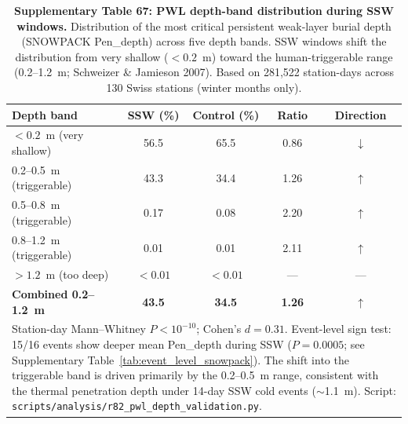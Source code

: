 \documentclass[11pt,letterpaper]{article}
\begin{document}

\begin{table}[!ht]
\centering
\caption{\textbf{Supplementary Table 67: PWL depth-band distribution during SSW windows.}
Distribution of the most critical persistent weak-layer burial depth (SNOWPACK Pen\_depth) across five depth bands. SSW windows shift the distribution from very shallow ($< 0.2$~m) toward the human-triggerable range (0.2--1.2~m; Schweizer \& Jamieson 2007). Based on 281,522 station-days across 130 Swiss stations (winter months only).}
\label{tab:pwl_depth_bands}
\small
\begin{tabular}{lcccc}
\toprule
Depth band & SSW (\%) & Control (\%) & Ratio & Direction \\
\midrule
$< 0.2$~m (very shallow) & 56.5 & 65.5 & 0.86 & $\downarrow$ \\
0.2--0.5~m (triggerable) & 43.3 & 34.4 & 1.26 & $\uparrow$ \\
0.5--0.8~m (triggerable) & 0.17 & 0.08 & 2.20 & $\uparrow$ \\
0.8--1.2~m (triggerable) & 0.01 & 0.01 & 2.11 & $\uparrow$ \\
$> 1.2$~m (too deep) & $< 0.01$ & $< 0.01$ & --- & --- \\
\midrule
\textbf{Combined 0.2--1.2~m} & \textbf{43.5} & \textbf{34.5} & \textbf{1.26} & $\uparrow$ \\
\bottomrule
\multicolumn{5}{p{12cm}}{\footnotesize Station-day Mann--Whitney $P < 10^{-10}$; Cohen's $d = 0.31$. Event-level sign test: 15/16 events show deeper mean Pen\_depth during SSW ($P = 0.0005$; see Supplementary Table~\ref{tab:event_level_snowpack}). The shift into the triggerable band is driven primarily by the 0.2--0.5~m range, consistent with the thermal penetration depth under 14-day SSW cold events ($\sim$1.1~m). Script: \texttt{scripts/analysis/r82\_pwl\_depth\_validation.py}.} \\
\end{tabular}
\end{table}
\end{document}
